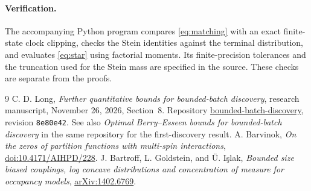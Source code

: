 \documentclass[11pt]{article}
\numberwithin{equation}{section}
\begin{document}
\paragraph{Verification.}
The accompanying Python program compares \eqref{eq:matching} with an exact
finite-state clock clipping, checks the Stein identities against the terminal
distribution, and evaluates \eqref{eq:star} using factorial moments. Its
finite-precision tolerances and the truncation used for the Stein mass are
specified in the source. These checks are separate from the proofs.

\begin{thebibliography}{9}
 C. D. Long, \emph{Further quantitative bounds for bounded-batch discovery},
research manuscript, November 26, 2026, Section~8. Repository
\href{https://github.com/long-mathematics/bounded-batch-discovery}{bounded-batch-discovery},
revision \texttt{8e80e42}. See also \emph{Optimal Berry--Esseen bounds for bounded-batch
discovery} in the same repository for the first-discovery result.
 A. Barvinok, \emph{On the zeros of partition functions with multi-spin
interactions}, \href{https://doi.org/10.4171/AIHPD/228}{doi:10.4171/AIHPD/228}.
 J. Bartroff, L. Goldstein, and \"U. I\c{s}lak,
\emph{Bounded size biased couplings, log concave distributions and concentration of
measure for occupancy models}, \href{https://arxiv.org/abs/1402.6769}{arXiv:1402.6769}.
\end{thebibliography}
\end{document}
